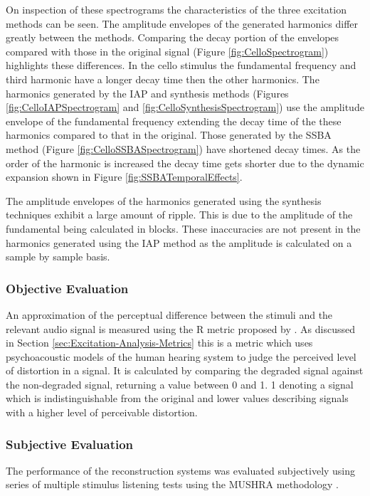 		On inspection of these spectrograms the characteristics of the three excitation methods can be seen. The
		amplitude envelopes of the generated harmonics differ greatly between the methods. Comparing the decay
		portion of the envelopes compared with those in the original signal (Figure \ref{fig:CelloSpectrogram})
		highlights these differences. In the cello stimulus the fundamental frequency and third harmonic have a
		longer decay time then the other harmonics. The harmonics generated by the IAP and synthesis methods
		(Figures \ref{fig:CelloIAPSpectrogram} and \ref{fig:CelloSynthesisSpectrogram}) use the amplitude envelope
		of the fundamental frequency extending the decay time of the these harmonics compared to that in the
		original. Those generated by the SSBA method (Figure \ref{fig:CelloSSBASpectrogram}) have shortened decay
		times. As the order of the harmonic is increased the decay time gets shorter due to the dynamic expansion
		shown in Figure \ref{fig:SSBATemporalEffects}.

		The amplitude envelopes of the harmonics generated using the synthesis techniques exhibit a large amount of
		ripple. This is due to the amplitude of the fundamental being calculated in blocks. These inaccuracies are
		not present in the harmonics generated using the IAP method as the amplitude is calculated on a sample by
		sample basis.

		\subsubsection*{Objective Evaluation}
			An approximation of the perceptual difference between the stimuli and the relevant audio signal is
			measured using the R metric proposed by \citet{tan2004predicting}. As discussed in
			Section \ref{sec:Excitation-Analysis-Metrics} this is a metric which uses psychoacoustic models of
			the human hearing system to judge the perceived level of distortion in a signal. It is calculated by
			comparing the degraded signal against the non-degraded signal, returning a value between 0 and 1. 1
			denoting a signal which is indistinguishable from the original and lower values describing signals
			with a higher level of perceivable distortion.

		\subsubsection*{Subjective Evaluation}
			The performance of the reconstruction systems was evaluated subjectively using series of multiple
			stimulus listening tests using the MUSHRA methodology \citep{mushra2014}.

